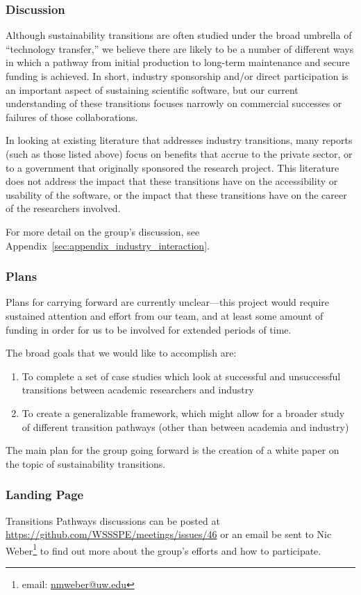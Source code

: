 \subsubsection{Discussion}

Although sustainability transitions are often studied under the broad umbrella of ``technology
transfer,'' we believe there are likely to be a number of different ways in which
a pathway from initial production to long-term maintenance and secure funding is
achieved. In short, industry sponsorship and/or direct participation is an important aspect of sustaining
scientific software, but our current understanding of these transitions focuses
narrowly on commercial successes or failures of those collaborations.

In looking at existing literature that addresses industry transitions, many
reports (such as those listed above) focus on benefits that accrue to the private sector, or to a government
that originally sponsored the research project. This literature does not address
the impact that these transitions have on the accessibility or usability of the
software, or the impact that these transitions have on the career of the
researchers involved.

For more detail on the group's discussion, see
Appendix~\ref{sec:appendix_industry_interaction}.

\subsubsection{Plans}

Plans for carrying forward are currently unclear---this project would require
sustained attention and effort from our team, and at least some amount of
funding in order for us to be involved for extended periods of time.

The broad goals that we would like to accomplish are: 

\begin{enumerate}
\item To complete a set of case studies which look at successful and unsuccessful transitions between academic researchers and industry
\item To create a generalizable framework, which might allow for a broader study of different transition pathways (other than between academia and industry)
\end{enumerate}

The main plan for the group going forward is the creation of a white paper on the topic of sustainability transitions. 

\subsubsection{Landing Page}
Transitions Pathways discussions can be posted at \url{https://github.com/WSSSPE/meetings/issues/46} or an email be sent to Nic Weber\footnote{email: \href{mailto:nmweber@uw.edu}{nmweber@uw.edu}} to find out more about the group's efforts and how to participate.